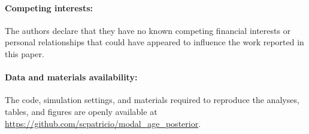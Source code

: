 \documentclass[12pt, letterpaper]{article}
\begin{document}
\paragraph*{Competing interests:} The authors declare that they have no known competing financial interests or personal relationships that could have appeared to influence the work reported in this paper.

\paragraph*{Data and materials availability:} The code, simulation settings, and materials required to reproduce the analyses, tables, and figures are openly available at \url{https://github.com/scpatricio/modal_age_posterior}.




\printbibliography

\end{document}
